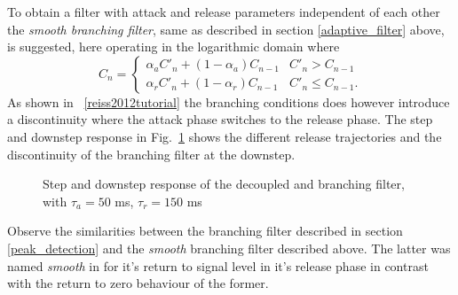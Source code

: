 \documentclass[../main2.tex]{subfiles}
\providecommand{\rootdir}{..}
\begin{document}
To obtain a filter with attack and release parameters independent of each other the \emph{smooth branching filter}, same as described in section \ref{adaptive_filter} above, is suggested, here operating in the logarithmic domain where 
\begin{equation}
C_n = \begin{cases}
    \alpha_{a} C'_n + (1-\alpha_{a}) C_{n-1} 	& C'_n > C_{n-1} \\
    \alpha_{r} C'_n + (1-\alpha_{r}) C_{n-1} 	& C'_n \leq C_{n-1}.
\end{cases}
\end{equation}
As shown in ~\ref{reiss2012tutorial} the branching conditions does however introduce a discontinuity where the attack phase switches to the release phase. The step and downstep response in Fig.~\ref{fig:step_reiss_filter} shows the different release trajectories and the discontinuity of the branching filter at the downstep.
\begin{figure}
\centerline{}
\caption{Step and downstep response of the decoupled and branching filter, with $\tau_a = 50$ ms, $\tau_r = 150$ ms}
\label{fig:step_reiss_filter}
\end{figure}
 Observe the similarities between the branching filter described in section \ref{peak_detection} and the \emph{smooth} branching filter described above. The latter was named \emph{smooth} in \cite{reiss2012tutorial} for it's return to signal level in it's release phase in contrast with the return to zero behaviour of the former.
\end{document}
